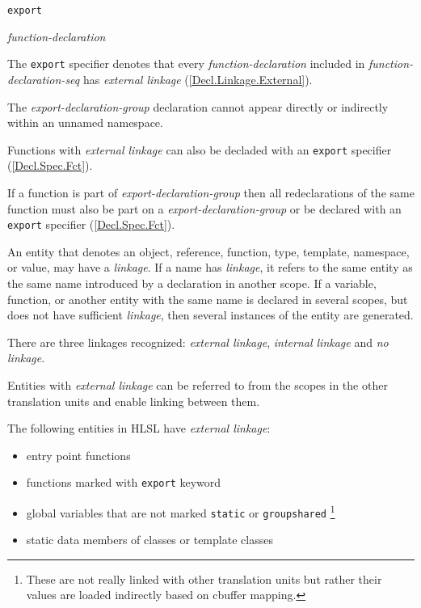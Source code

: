\begin{grammar}
  \br
  \texttt{export} \terminal{\{}  \terminal{\}}\br
  
  \br
  \textit{function-declaration} 
\end{grammar}

\p The \texttt{export} specifier denotes that every \textit{function-declaration} included in \textit{function-declaration-seq} has \textit{external linkage} (\ref{Decl.Linkage.External}).

\p The \textit{export-declaration-group} declaration cannot appear directly or indirectly within an unnamed namespace.

\p Functions with \textit{external linkage} can also be decladed with an \texttt{export} specifier (\ref{Decl.Spec.Fct}).

\p If a function is part of \textit{export-declaration-group} then all redeclarations of the same function must also be part on a \textit{export-declaration-group} or be declared with an \texttt{export} specifier (\ref{Decl.Spec.Fct}).


\p An entity that denotes an object, reference, function, type, template, namespace, or value, may have a \textit{linkage}. If a name has \textit{linkage}, it refers to the same entity as the same name introduced by a declaration in another scope. If a variable, function, or another entity with the same name is declared in several scopes, but does not have sufficient \textit{linkage}, then several instances of the entity are generated.

\p There are three linkages recognized: \textit{external linkage}, \textit{internal linkage} and \textit{no linkage}.


\p Entities with \textit{external linkage} can be referred to from the scopes in the other translation units and enable linking between them.

\p The following entities in HLSL have \textit{external linkage}:
\begin{itemize}
  \item entry point functions
  \item functions marked with \texttt{export} keyword
  \item global variables that are not marked \texttt{static} or \texttt{groupshared} \footnote{These are not really linked with other translation units but rather their values are loaded indirectly based on cbuffer mapping.}
  \item static data members of classes or template classes
\end{itemize}

